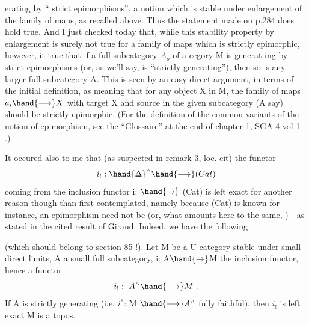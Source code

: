 erating by  ``\hand{\uline{\textcolor{black}{universally}}} strict epimorphisms'',  a notion which
is stable under enlargement of the family of maps,  as recalled above.
Thus the statement made on p.284 does hold true.  And I just checked today
that,  while this stability property by enlargement is surely not  true
for a family of maps which is strictly epimorphic,  however,  it \hand{\uline{\textcolor{black}{is}}}
true that if a full subcategory $A_o$ of a cegory M is generat ing by
strict epimorphisms  (or,  as we'll say,  is ``strictly generating''),
then so is any larger full subcategory A.  This is seen by an easy direct
argument,  in terms of the initial definition,  as meaning that for any
object X in M,  the family of maps  $a_i \hand{\longrightarrow} X$  with target X and source in
the given subcategory (A say) should be strictly epimorphic. (For the
definition of the  common variants  of the notion of epimorphism,
\margin{$\times$} see the ``Glossaire'' at the end of chapter 1,  SGA 4  vol 1 .)

It occured also to me that  (as suspected in remark 3,  loc. cit)
the functor
\[ i_{!} : \hand{\Delta}^{\wedge} \hand{\longrightarrow} (Cat) \]
coming from the inclusion functor i: \hand{$\Delta$} $\hand{\to}$ (Cat)  is \hand{\uline{\textcolor{black}{not}}}  left exact\unsure{\deleted{,}}
\hand{(}for another reason though than first contemplated\hand{)}, namely because (Cat)
is known \hand{\uline{\textcolor{black}{not to be a topos}}} \unsure{\deleted{,}}\hand{(}for instance,  an epimorphism need not
be \hand{\uline{\textcolor{black}{strict}}} (or,  what amounts here to the same,  \hand{\uline{\textcolor{black}{effective}}}) -  as stated
in the cited result of Giraud\hand{)}. Indeed,  we have the following

\hand{\uline{\textcolor{black}{Proposition}}} (which should belong to section 85 !).  Let M be a \underline{U}-category
stable under small direct limits,  A a small full subcategory,  i: A$\hand{\to}$M
the inclusion functor,  hence a functor
\[ i_{!} :\ A^{\wedge} \hand{\longrightarrow} M\ . \]
If A is strictly generating  (i.e.  $i^{*}$: M $\hand{\longrightarrow} A^{\wedge}$ fully faithful),  then 
$i_{!}$  is left exact  M is a topos.

